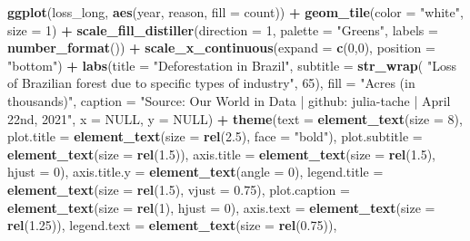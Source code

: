 \documentclass[
]{article}
\newenvironment{Shaded}{\begin{snugshade}}{\end{snugshade}}
\newcommand{\DataTypeTok}[1]{\textcolor[rgb]{0.13,0.29,0.53}{#1}}
\newcommand{\DecValTok}[1]{\textcolor[rgb]{0.00,0.00,0.81}{#1}}
\newcommand{\FloatTok}[1]{\textcolor[rgb]{0.00,0.00,0.81}{#1}}
\newcommand{\KeywordTok}[1]{\textcolor[rgb]{0.13,0.29,0.53}{\textbf{#1}}}
\newcommand{\NormalTok}[1]{#1}
\newcommand{\OperatorTok}[1]{\textcolor[rgb]{0.81,0.36,0.00}{\textbf{#1}}}
\newcommand{\OtherTok}[1]{\textcolor[rgb]{0.56,0.35,0.01}{#1}}
\newcommand{\StringTok}[1]{\textcolor[rgb]{0.31,0.60,0.02}{#1}}
\begin{document}
\begin{Shaded}
\begin{Highlighting}[]
\KeywordTok{ggplot}\NormalTok{(loss\_long, }\KeywordTok{aes}\NormalTok{(year, reason, }\DataTypeTok{fill =}\NormalTok{ count)) }\OperatorTok{+}\StringTok{ }
\StringTok{  }\KeywordTok{geom\_tile}\NormalTok{(}\DataTypeTok{color =} \StringTok{"white"}\NormalTok{, }\DataTypeTok{size =} \DecValTok{1}\NormalTok{) }\OperatorTok{+}\StringTok{ }
\StringTok{  }\KeywordTok{scale\_fill\_distiller}\NormalTok{(}\DataTypeTok{direction =} \DecValTok{1}\NormalTok{, }\DataTypeTok{palette =} \StringTok{"Greens"}\NormalTok{, }\DataTypeTok{labels =} \KeywordTok{number\_format}\NormalTok{()) }\OperatorTok{+}
\StringTok{  }\KeywordTok{scale\_x\_continuous}\NormalTok{(}\DataTypeTok{expand =} \KeywordTok{c}\NormalTok{(}\DecValTok{0}\NormalTok{,}\DecValTok{0}\NormalTok{), }\DataTypeTok{position =} \StringTok{"bottom"}\NormalTok{) }\OperatorTok{+}
\StringTok{  }\KeywordTok{labs}\NormalTok{(}\DataTypeTok{title =} \StringTok{"Deforestation in Brazil"}\NormalTok{,}
    \DataTypeTok{subtitle =} \KeywordTok{str\_wrap}\NormalTok{(}
      \StringTok{"Loss of Brazilian forest due to specific types of industry"}\NormalTok{, }\DecValTok{65}\NormalTok{),}
    \DataTypeTok{fill =} \StringTok{"Acres (in thousands)"}\NormalTok{,}
    \DataTypeTok{caption =} \StringTok{"Source: Our World in Data | github: julia{-}tache | April 22nd, 2021"}\NormalTok{,}
    \DataTypeTok{x =} \OtherTok{NULL}\NormalTok{, }
    \DataTypeTok{y =} \OtherTok{NULL}\NormalTok{) }\OperatorTok{+}\StringTok{ }
\StringTok{  }\KeywordTok{theme}\NormalTok{(}\DataTypeTok{text =} \KeywordTok{element\_text}\NormalTok{(}\DataTypeTok{size =} \DecValTok{8}\NormalTok{),}
        \DataTypeTok{plot.title =} \KeywordTok{element\_text}\NormalTok{(}\DataTypeTok{size =} \KeywordTok{rel}\NormalTok{(}\FloatTok{2.5}\NormalTok{), }\DataTypeTok{face =} \StringTok{"bold"}\NormalTok{),}
        \DataTypeTok{plot.subtitle =} \KeywordTok{element\_text}\NormalTok{(}\DataTypeTok{size =} \KeywordTok{rel}\NormalTok{(}\FloatTok{1.5}\NormalTok{)),}
        \DataTypeTok{axis.title =} \KeywordTok{element\_text}\NormalTok{(}\DataTypeTok{size =} \KeywordTok{rel}\NormalTok{(}\FloatTok{1.5}\NormalTok{), }\DataTypeTok{hjust =} \DecValTok{0}\NormalTok{), }
        \DataTypeTok{axis.title.y =} \KeywordTok{element\_text}\NormalTok{(}\DataTypeTok{angle =} \DecValTok{0}\NormalTok{),}
        \DataTypeTok{legend.title =} \KeywordTok{element\_text}\NormalTok{(}\DataTypeTok{size =} \KeywordTok{rel}\NormalTok{(}\FloatTok{1.5}\NormalTok{), }\DataTypeTok{vjust =} \FloatTok{0.75}\NormalTok{),}
        \DataTypeTok{plot.caption =} \KeywordTok{element\_text}\NormalTok{(}\DataTypeTok{size =} \KeywordTok{rel}\NormalTok{(}\DecValTok{1}\NormalTok{), }\DataTypeTok{hjust =} \DecValTok{0}\NormalTok{),}
        \DataTypeTok{axis.text =} \KeywordTok{element\_text}\NormalTok{(}\DataTypeTok{size =} \KeywordTok{rel}\NormalTok{(}\FloatTok{1.25}\NormalTok{)),}
        \DataTypeTok{legend.text =} \KeywordTok{element\_text}\NormalTok{(}\DataTypeTok{size =} \KeywordTok{rel}\NormalTok{(}\FloatTok{0.75}\NormalTok{)),}
        

\end{Highlighting}
\end{Shaded}
\end{document}
